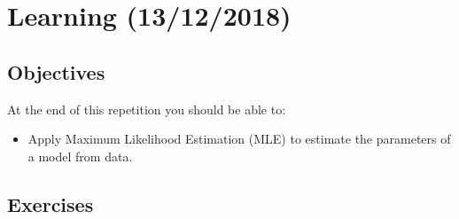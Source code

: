 \documentclass[a4paper, 10pt]{article}
\begin{document}


   \setcounter{page}{1}
   \section{Learning (13/12/2018)}

   \subsection{Objectives}
   At the end of this repetition you should be able to:
   \begin{itemize}
      \item Apply Maximum Likelihood Estimation (MLE) to estimate the parameters of a model from data.
   \end{itemize}
   \subsection{Exercises}
\end{document}
